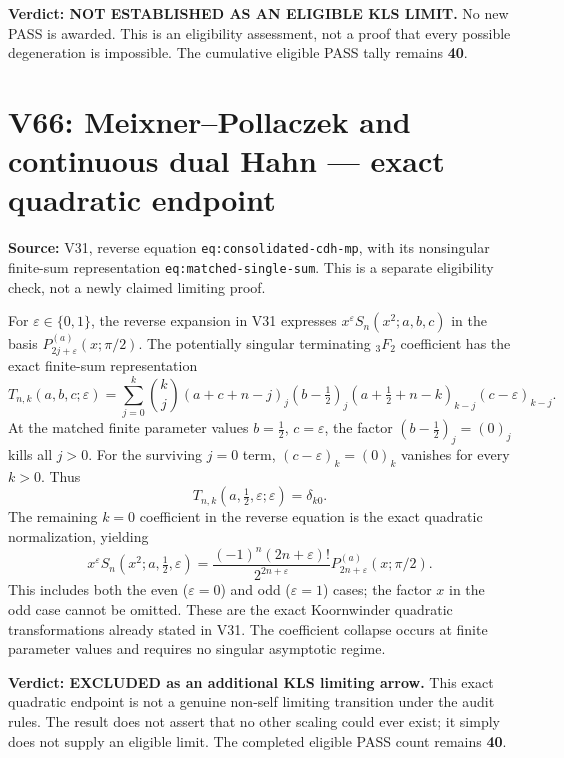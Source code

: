 \documentclass[11pt]{article}
\begin{document}
\noindent\textbf{Verdict: NOT ESTABLISHED AS AN ELIGIBLE KLS LIMIT.} No new PASS is awarded. This is an eligibility assessment, not a proof that every possible degeneration is impossible. The cumulative eligible PASS tally remains \textbf{40}.


\section{V66: Meixner--Pollaczek and continuous dual Hahn --- exact quadratic endpoint}
\noindent\textbf{Source:} V31, reverse equation \texttt{eq:consolidated-cdh-mp}, with its nonsingular finite-sum representation \texttt{eq:matched-single-sum}. This is a separate eligibility check, not a newly claimed limiting proof.

For $\varepsilon\in\{0,1\}$, the reverse expansion in V31 expresses
$x^\varepsilon S_n(x^2;a,b,c)$ in the basis
$P_{2j+\varepsilon}^{(a)}(x;\pi/2)$. The potentially singular terminating ${}_3F_2$ coefficient has the exact finite-sum representation
\[
T_{n,k}(a,b,c;\varepsilon)=\sum_{j=0}^{k}\binom{k}{j}
(a+c+n-j)_j(b-\tfrac12)_j
(a+\tfrac12+n-k)_{k-j}(c-\varepsilon)_{k-j}.
\]
At the matched finite parameter values $b=\tfrac12$, $c=\varepsilon$, the factor $(b-\tfrac12)_j=(0)_j$ kills all $j>0$. For the surviving $j=0$ term, $(c-\varepsilon)_k=(0)_k$ vanishes for every $k>0$. Thus
\[
\boxed{T_{n,k}(a,\tfrac12,\varepsilon;\varepsilon)=\delta_{k0}.}
\]
The remaining $k=0$ coefficient in the reverse equation is the exact quadratic normalization, yielding
\[
\boxed{
 x^\varepsilon S_n(x^2;a,\tfrac12,\varepsilon)
 =\frac{(-1)^n(2n+\varepsilon)!}{2^{2n+\varepsilon}}
 P_{2n+\varepsilon}^{(a)}(x;\pi/2).
}
\]
This includes both the even ($\varepsilon=0$) and odd ($\varepsilon=1$) cases; the factor $x$ in the odd case cannot be omitted. These are the exact Koornwinder quadratic transformations already stated in V31. The coefficient collapse occurs at finite parameter values and requires no singular asymptotic regime.

\noindent\textbf{Verdict: EXCLUDED as an additional KLS limiting arrow.} This exact quadratic endpoint is not a genuine non-self limiting transition under the audit rules. The result does not assert that no other scaling could ever exist; it simply does not supply an eligible limit. The completed eligible PASS count remains \textbf{40}.
\end{document}
